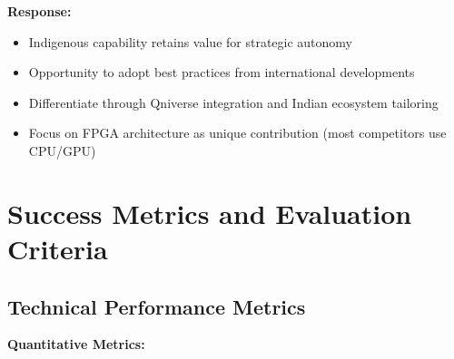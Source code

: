 \documentclass[12pt,a4paper]{article}
\begin{document}
\textbf{Response:}
\begin{itemize}[noitemsep]
\item Indigenous capability retains value for strategic autonomy
\item Opportunity to adopt best practices from international developments
\item Differentiate through Qniverse integration and Indian ecosystem tailoring
\item Focus on FPGA architecture as unique contribution (most competitors use CPU/GPU)
\end{itemize}

\newpage

\section{Success Metrics and Evaluation Criteria}

\subsection{Technical Performance Metrics}

\textbf{Quantitative Metrics:}
\end{document}
